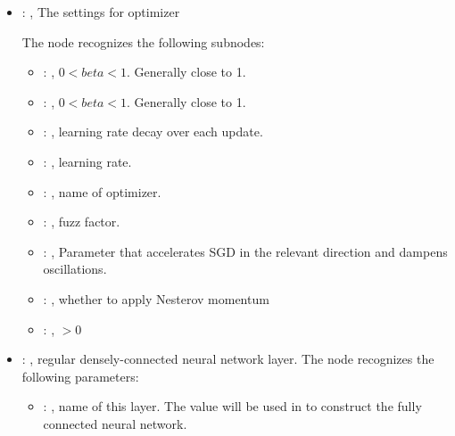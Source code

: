 \begin{itemize}
    \item {}: , 
      The settings for optimizer

      The  node recognizes the following subnodes:
      \begin{itemize}
        \item {}: , 
          $0 < beta < 1$. Generally close to 1.

        \item {}: , 
          $0 < beta < 1$. Generally close to 1.

        \item {}: , 
          learning rate decay over each update.

        \item {}: , 
          learning rate.

        \item {}: , 
          name of optimizer.

        \item {}: , 
          fuzz factor.

        \item {}: , 
          Parameter that accelerates SGD in         the relevant direction and dampens oscillations.

        \item {}: , 
          whether to apply Nesterov momentum

        \item {}: , 
          $> 0$
      \end{itemize}

    \item {}: , 
      regular densely-connected neural network layer.
      The  node recognizes the following parameters:
        \begin{itemize}
          \item {}: , 
            name of this layer. The value will be         used in  to
            construct the fully connected neural network.
      \end{itemize}


\end{itemize}
